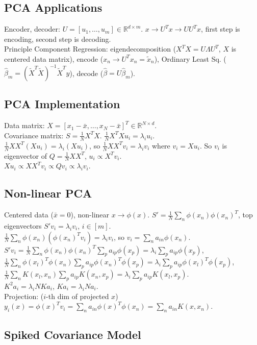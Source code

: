 \subsection*{PCA Applications}

Encoder, decoder: $U = [u_1, \dots, u_m] \in \mathbb{R}^{d \times m}$. $x \rightarrow U^T x \rightarrow UU^T x$, first step is encoding, second step is decoding.\\
Principle Component Regression: eigendecomposition ($X^T X = U \Lambda U^T$, $X$ is centered data matrix), encode ($x_n \rightarrow U^T x_n = \tilde{x}_n$), Ordinary Least Sq. ($\hat{\beta}_m = (\tilde{X}^T\tilde{X})^{-1}\tilde{X}^Ty$), decode ($\hat{\beta} = U \hat{\beta}_m$).

\subsection*{PCA Implementation}

Data matrix: $X = [x_1 - \bar{x}, \dots, x_N - \bar{x}]^T \in \mathbb{R}^{N \times d}$.\\
Covariance matrix: $S = \frac{1}{N}X^TX$. $\frac{1}{N}X^TXu_i = \lambda_i u_i$.\\
$\frac{1}{N}XX^T(Xu_i) = \lambda_i (Xu_i)$, so $\frac{1}{N}XX^T v_i = \lambda_i v_i$ where $v_i = X u_i$. So $v_i$ is eigenvector of $Q = \frac{1}{N}XX^T$, $u_i \propto X^T v_i$.\\
$Xu_i \propto XX^T v_i \propto Qv_i \propto \lambda_i v_i$.

\subsection*{Non-linear PCA}

Centered data ($\bar{x} = 0$), non-linear $x \rightarrow \phi(x)$. $S' = \frac{1}{N}\sum_n \phi(x_n) \phi(x_n)^T$, top eigenvectors $S'v_i = \lambda_i v_i$, $i \in [m]$.\\
$\frac{1}{N}\sum_n \phi(x_n)(\phi(x_n)^T v_i) = \lambda_i v_i$, so $v_i = \sum_n a_{in}\phi(x_n)$.\\
$S' v_i = \frac{1}{N}\sum_n \phi(x_n)\phi(x_n)^T \sum_p a_{ip}\phi(x_p) = \lambda_i \sum_p a_{ip}\phi(x_p)$, $\frac{1}{N}\sum_n \phi(x_l)^T \phi(x_n) \sum_p a_{ip}\phi(x_n)^T \phi(x_p) = \lambda_i \sum_p a_{ip}\phi(x_l)^T \phi(x_p)$, $\frac{1}{N}\sum_n K(x_l, x_n) \sum_p a_{ip}K(x_n, x_p) = \lambda_i \sum_p a_{ip}K(x_l, x_p)$.\\
$K^2 a_i = \lambda_i NKa_i$, $Ka_i = \lambda_i Na_i$.\\
Projection: ($i$-th dim of projected $x$) $y_i(x) = \phi(x)^T v_i = \sum_n a_{in}\phi(x)^T\phi(x_n) = \sum_n a_{in} K(x, x_n)$.

\subsection*{Spiked Covariance Model}


